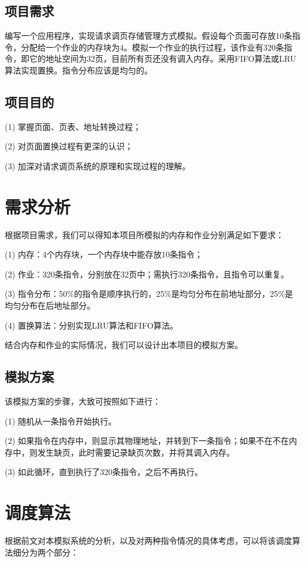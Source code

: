 \documentclass{article}
\begin{document}
\begin{CJK}{UTF8}{gbsn}
\subsection{项目需求}
编写一个应用程序，实现请求调页存储管理方式模拟。假设每个页面可存放10条指令，分配给一个作业的内存块为4。模拟一个作业的执行过程，该作业有320条指令，即它的地址空间为32页，目前所有页还没有调入内存。采用FIFO算法或LRU算法实现置换。指令分布应该是均匀的。

\subsection{项目目的}
(1) 掌握页面、页表、地址转换过程；

(2) 对页面置换过程有更深的认识；

(3) 加深对请求调页系统的原理和实现过程的理解。


\vspace{4em}

\section{需求分析}
根据项目需求，我们可以得知本项目所模拟的内存和作业分别满足如下要求：

(1) 内存：4个内存块，一个内存块中能存放10条指令；

(2) 作业：320条指令，分别放在32页中；需执行320条指令，且指令可以重复。

(3) 指令分布：50\%的指令是顺序执行的，25\%是均匀分布在前地址部分，25\%是均匀分布在后地址部分。

(4) 置换算法：分别实现LRU算法和FIFO算法。


结合内存和作业的实际情况，我们可以设计出本项目的模拟方案。

\subsection{模拟方案}
该模拟方案的步骤，大致可按照如下进行：

(1) 随机从一条指令开始执行。

(2) 如果指令在内存中，则显示其物理地址，并转到下一条指令；如果不在不在内存中，则发生缺页，此时需要记录缺页次数，并将其调入内存。

(3) 如此循环，直到执行了320条指令，之后不再执行。


\clearpage

\section{调度算法}
根据前文对本模拟系统的分析，以及对两种指令情况的具体考虑，可以将该调度算法细分为两个部分：


\end{CJK}
\end{document}

